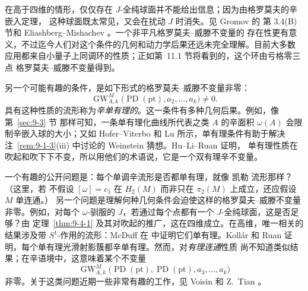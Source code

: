 \begin{remark}\label{rem:9-4-12}
在高于四维的情形，仅仅存在 $J$-全纯球面并不能给出信息；因为由格罗莫夫的辛嵌入定理，
这种球面既太常见，又会在扰动 $J$ 时消失。见 Gromov  的
第 3.4(B) 节和 Eliashberg--Mishachev 。一个非平凡格罗莫夫--威滕不变量的
存在性更有意义，不过迄今人们对这个条件的几何和动力学后果还远未完全理解。目前大多数
应用都来自小量子上同调环的性质；正如第~11.1 节将看到的，这个环由亏格零三点
格罗莫夫--威滕不变量得到。

另一个可能有趣的条件，是如下形式的格罗莫夫--威滕不变量非零：
\[
  \operatorname{GW}^{M}_{A,k}
  \bigl(\operatorname{PD}(\mathrm{pt}),a_2,\ldots,a_k\bigr)\ne0.
\]
具有这种性质的流形称为\emph{辛单有理的}。这一条件有多种几何后果。例如，像第~\ref{sec:9-3} 节
那样可知，一条单有理化曲线所代表之类 $A$ 的辛面积 $\omega(A)$ 会限制辛嵌入球的大小；又如
Hofer--Viterbo  和 Lu  所示，单有理条件有助于解决
注~\ref{rem:9-1-3}(iii) 中讨论的 Weinstein 猜想。Hu--Li--Ruan  证明，
单有理性质在
吹起和吹下下不变，所以用他们的术语说，它是一个双有理辛不变量。

一个有趣的公开问题是：每个单调辛流形是否都单有理，就像 凯勒 流形那样？（这里，若
不假设 $[\omega]=c_1$ 在 $H_2(M)$ 而非只在 $\pi_2(M)$ 上成立，还应假设 $M$ 单连通。）
另一个问题是理解何种几何条件会迫使这样的格罗莫夫--威滕不变量非零。例如，对每个
$\omega$-驯服的 $J$，若通过每个点都有一个 $J$-全纯球面，这是否足够？由
定理~\ref{thm:9-4-1} 及其对吹起的推广，这在四维成立。在高维，唯一相关的结果涉及带
$S^1$-作用的流形：McDuff 在  中证明它们单有理。Kollár 和 Ruan
 证明，每个单有理光滑射影簇都辛单有理。然而，对\emph{有理连通}性质
尚不知道类似结果；在辛语境中，这意味着某个不变量
\[
  \operatorname{GW}^{M}_{A,k}
  \bigl(\operatorname{PD}(\mathrm{pt}),\operatorname{PD}(\mathrm{pt}),
  a_3,\ldots,a_k\bigr)
\]
非零。关于这类问题近期一些非常有趣的工作，见 Voisin  和
Z.~Tian 。
\end{remark}
